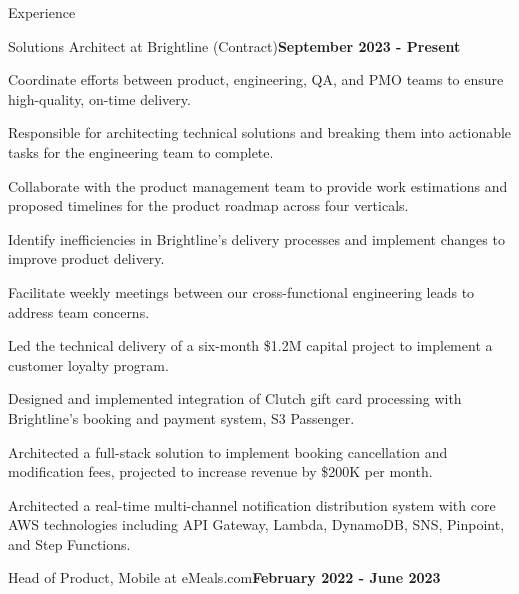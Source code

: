 \documentclass{resume} %
\begin{document}
\begin{rSection}{Experience}


    \begin{rSubsection}{Solutions Architect at Brightline (Contract)}{\bf September 2023 - Present}{}{}

    \item Coordinate efforts between product, engineering, QA, and PMO teams to ensure high-quality, on-time delivery.
    \item Responsible for architecting technical solutions and breaking them into actionable tasks for the engineering team to complete.        
    \item Collaborate with the product management team to provide work estimations and proposed timelines for the product roadmap across four verticals.    
    \item Identify inefficiencies in Brightline's delivery processes and implement changes to improve product delivery.
    \item Facilitate weekly meetings between our cross-functional engineering leads to address team concerns.
    \item Led the technical delivery of a six-month \$1.2M capital project to implement a customer loyalty program.
    \item Designed and implemented integration of Clutch gift card processing with Brightline's booking and payment system, S3 Passenger.
    \item Architected a full-stack solution to implement booking cancellation and modification fees, projected to increase revenue by \$200K per month.
    \item Architected a real-time multi-channel notification distribution system with core AWS technologies including API Gateway, Lambda, DynamoDB, SNS, Pinpoint, and Step Functions.

    \end{rSubsection}



    \begin{rSubsection}{Head of Product, Mobile at eMeals.com}{\bf February 2022 - June 2023}{}{}


\end{rSubsection}
\end{rSection}
\end{document}
